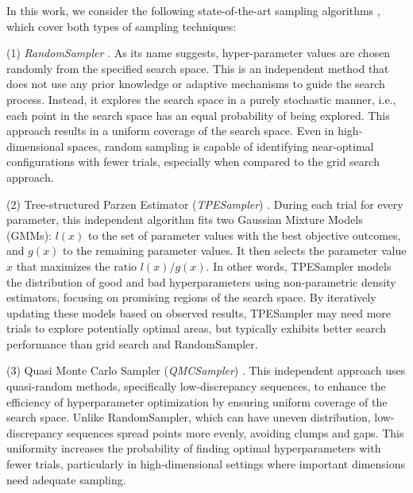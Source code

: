 In this work, we consider the following state-of-the-art sampling algorithms \cite{OPTUNA}, which cover both types of sampling techniques:

(1)  \emph{RandomSampler} \cite{QMCSampler}. As its name suggests,  
    hyper-parameter values are chosen randomly from the specified search space. This is an independent method that does not use any prior knowledge or adaptive mechanisms to guide the search process. Instead, it 
    explores the search space in a purely stochastic manner, i.e.,
    each point in the search space has an equal probability of being explored. This approach results in a uniform coverage of the search space. Even in high-dimensional spaces, random sampling is capable of identifying near-optimal configurations with fewer trials, especially when compared to the grid search approach. 

(2) Tree-structured Parzen Estimator (\emph{TPESampler}) \cite{TPE1, TPE2, TPE3}.
    During each trial for every parameter, this independent algorithm fits two Gaussian Mixture Models (GMMs): \( l(x) \) to the set of parameter values with the best objective outcomes, and \( g(x) \) to the remaining parameter values. It then selects the parameter value \( x \) that maximizes the ratio \( l(x) / g(x) \).  In other words, TPESampler models the distribution of good and bad hyperparameters using non-parametric density estimators, focusing on promising regions of the search space. By iteratively updating these models based on observed results, TPESampler may need more trials to explore potentially optimal areas, but typically exhibits better search performance than grid search and RandomSampler. 

(3) Quasi Monte Carlo Sampler (\emph{QMCSampler}) \cite{QMCSampler}. This independent approach uses quasi-random methods, specifically low-discrepancy sequences, to enhance the efficiency of hyperparameter optimization by ensuring uniform coverage of the search space. Unlike RandomSampler, which can have uneven distribution, low-discrepancy sequences spread points more evenly, avoiding clumps and gaps. This uniformity increases the probability of finding optimal hyperparameters with fewer trials, particularly in high-dimensional settings where important dimensions need adequate sampling. 


